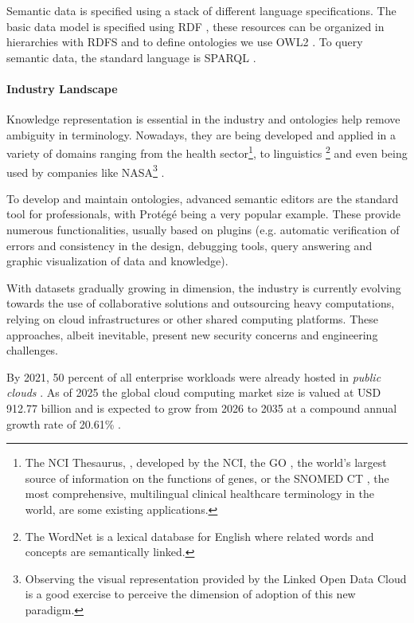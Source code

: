 Semantic data is specified using a stack of different language specifications. The basic data model is specified using \gls{RDF} \autocite{W3c_undated-vq}, these resources can be organized in hierarchies with \gls{RDFS} \autocite{W3c_undated-mp} and to define ontologies we use \gls{OWL2} \autocite{W3c_undated-dr}. To query semantic data, the standard language is \gls{SPARQL} \autocite{W3c2013-hd, W3c_undated-tw, W3c2008-vf}.


\paragraph{Industry Landscape} Knowledge representation is essential in the industry \autocite{Noy2019-lj} and ontologies help remove ambiguity in terminology.
Nowadays, they are being developed and applied in a variety of domains \autocite{W3c_undated-pd} ranging from the health sector\footnote{The NCI Thesaurus, \autocite{Sioutos2007-ep}, developed by the \gls{NCI}, the \gls{GO} \autocite{Harris2004-tf}, the world’s largest source of information on the functions of genes, or the \gls{SNOMED CT} \autocite{SNOMED-gi}, the most comprehensive, multilingual clinical healthcare terminology in the world, are some existing applications.}, to linguistics \footnote{The WordNet \autocite{Miller1995-ic} is a lexical database for English where related words and concepts are semantically linked.} and even being used by companies like NASA\footnote{Observing the visual representation provided by the Linked Open Data Cloud \autocite{McCrae_undated-or} is a good exercise to perceive the dimension of adoption of this new paradigm.} \autocite{Ashish2005-qz}.

To develop and maintain ontologies, advanced semantic editors are the standard tool for professionals, with Protégé \autocite{Musen2015-kh} being a very popular example. These provide numerous functionalities, usually based on plugins (e.g. automatic verification of errors and consistency in the design, debugging tools, query answering and graphic visualization of data and knowledge).

With datasets gradually growing in dimension, the industry is currently evolving towards the use of collaborative solutions \autocite{Tudorache2008-tu,Tudorache2009-ja} and outsourcing heavy computations, relying on cloud infrastructures or other shared computing platforms. These approaches, albeit inevitable, present new security concerns and engineering challenges.

By 2021, 50 percent of all enterprise workloads were already hosted in \emph{public clouds} \autocite{Security_Compass2021-sh}. As of 2025 the global cloud computing market size is valued at USD 912.77 billion and is expected to grow from 2026 to 2035 at a compound annual growth rate of 20.61\% \autocite{PrecedenceResearchCloudMarketSize2025-zd}.

